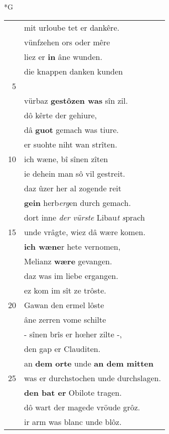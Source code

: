 \documentclass[8pt,a4paper,notitlepage]{article}
\begin{document}
\begin{table}[ht]
\begin{minipage}[t]{0.5\linewidth}
\small
\begin{center}*G
\end{center}
\begin{tabular}{rl}
 & mit urloube tet er dankêre.\\ 
 & vünfzehen ors oder mêre\\ 
 & liez er \textbf{in} âne wunden.\\ 
 & die knappen danken kunden\\ 
5 & \textbf{\textit{\begin{large}U\end{large}}\textit{nde}} bâten in belîben vil.\\ 
 & vürbaz \textbf{gestôzen was} sîn zil.\\ 
 & dô kêrte der gehiure,\\ 
 & dâ \textbf{guot} gemach was tiure.\\ 
 & er suohte niht wan strîten.\\ 
10 & ich wæne, bî sînen zîten\\ 
 & ie dehein man sô vil gestreit.\\ 
 & daz ûzer her al zogende reit\\ 
 & \textbf{gein} herb\textit{erg}en durch gemach.\\ 
 & dort inne \textit{der vürste} Libau\textit{t} \textit{s}prach\\ 
15 & unde vrâgte, wiez dâ wære komen.\\ 
 & \textbf{ich wæne}r hete vernomen,\\ 
 & Melianz \textbf{wære} gevangen.\\ 
 & daz was im liebe ergangen.\\ 
 & ez kom im sît ze trôste.\\ 
20 & Gawan den ermel lôste\\ 
 & âne zerren vome schilte\\ 
 & - sînen brîs er hœher zilte -,\\ 
 & den gap er Clauditen.\\ 
 & an \textbf{dem orte} unde \textbf{an dem mitten}\\ 
25 & was er durchstochen unde durchslagen.\\ 
 & \textbf{den bat er} Obilote tragen.\\ 
 & dô wart der magede vröude grôz.\\ 
 & ir arm was blanc unde blôz.\\ 

\end{tabular}
\end{minipage}
\end{table}
\end{document}

